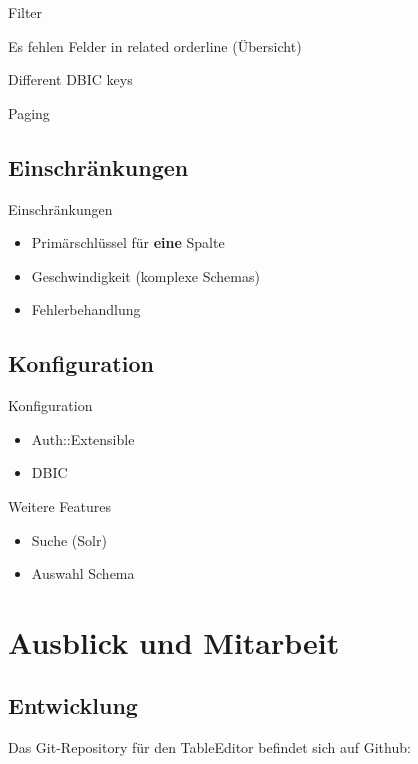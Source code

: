 Filter

Es fehlen Felder in related orderline (Übersicht)

Different DBIC keys

Paging

\subsection{Einschränkungen}
\begin{frame}{Einschränkungen}
\begin{itemize}
\item Primärschlüssel für \textbf{eine} Spalte
\item Geschwindigkeit (komplexe Schemas)
\item Fehlerbehandlung
\end{itemize}
\end{frame}

\subsection{Konfiguration}
\begin{frame}{Konfiguration}
\begin{itemize}
\item Auth::Extensible
\item DBIC
\end{itemize}
\end{frame}

\begin{frame}{Weitere Features}
\begin{itemize}
\item Suche (Solr)
\item Auswahl Schema
\end{itemize}
\end{frame}

\section{Ausblick und Mitarbeit}

\subsection{Entwicklung}

Das Git-Repository für den TableEditor befindet sich auf Github:

